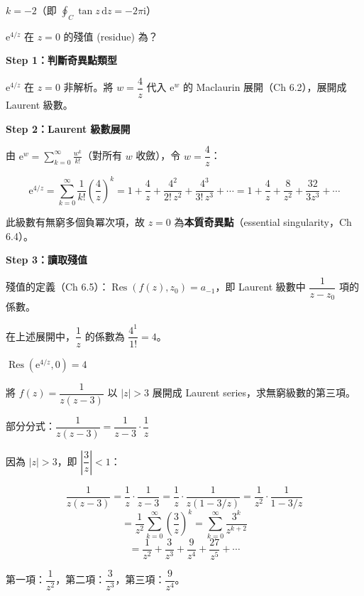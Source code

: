 \documentclass[12pt,a4paper]{article}
\newcommand{\dd}{\,\mathrm{d}}
\newcommand{\ii}{\mathrm{i}}
\newcommand{\ee}{\mathrm{e}}
\newcommand{\Res}{\operatorname{Res}}
\begin{document}
\begin{ansbox}
$k=\boxed{-2}$（即 $\oint_C\tan z\dd{z}=-2\pi\ii$）
\end{ansbox}

\begin{qbox}[第 7 題]
$\ee^{4/z}$ 在 $z=0$ 的殘值 (residue) 為？
\end{qbox}

\begin{solbox}[解]
\textbf{Step 1：判斷奇異點類型}

$\ee^{4/z}$ 在 $z=0$ 非解析。將 $w=\dfrac{4}{z}$ 代入 $\ee^w$ 的 Maclaurin 展開（Ch 6.2），展開成 Laurent 級數。

\textbf{Step 2：Laurent 級數展開}

由 $\ee^w=\displaystyle\sum_{k=0}^{\infty}\frac{w^k}{k!}$（對所有 $w$ 收斂），令 $w=\dfrac{4}{z}$：

$$\ee^{4/z}=\sum_{k=0}^{\infty}\frac{1}{k!}\left(\frac{4}{z}\right)^k=1+\frac{4}{z}+\frac{4^2}{2!\,z^2}+\frac{4^3}{3!\,z^3}+\cdots=1+\frac{4}{z}+\frac{8}{z^2}+\frac{32}{3z^3}+\cdots$$

此級數有無窮多個負冪次項，故 $z=0$ 為\textbf{本質奇異點}（essential singularity，Ch 6.4）。

\textbf{Step 3：讀取殘值}

殘值的定義（Ch 6.5）：$\Res(f(z),z_0)=a_{-1}$，即 Laurent 級數中 $\dfrac{1}{z-z_0}$ 項的係數。

在上述展開中，$\dfrac{1}{z}$ 的係數為 $\dfrac{4^1}{1!}=4$。
\end{solbox}

\begin{ansbox}
$\Res(\ee^{4/z},0)=\boxed{4}$
\end{ansbox}

\begin{qbox}[第 8 題]
將 $f(z)=\dfrac{1}{z(z-3)}$ 以 $|z|>3$ 展開成 Laurent series，求無窮級數的第三項。
\end{qbox}

\begin{solbox}[解]
部分分式：$\dfrac{1}{z(z-3)}=\dfrac{1}{z-3}\cdot\dfrac{1}{z}$

因為 $|z|>3$，即 $\left|\dfrac{3}{z}\right|<1$：

$$\frac{1}{z(z-3)}=\frac{1}{z}\cdot\frac{1}{z-3}=\frac{1}{z}\cdot\frac{1}{z(1-3/z)}=\frac{1}{z^2}\cdot\frac{1}{1-3/z}$$
$$=\frac{1}{z^2}\sum_{k=0}^{\infty}\left(\frac{3}{z}\right)^k=\sum_{k=0}^{\infty}\frac{3^k}{z^{k+2}}$$
$$=\frac{1}{z^2}+\frac{3}{z^3}+\frac{9}{z^4}+\frac{27}{z^5}+\cdots$$

第一項：$\dfrac{1}{z^2}$，第二項：$\dfrac{3}{z^3}$，第三項：$\dfrac{9}{z^4}$。
\end{solbox}
\end{document}
